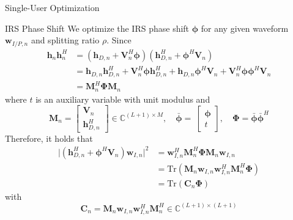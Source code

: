 \documentclass{IEEEtran}
\begin{document}
\begin{section}{Single-User Optimization}
	\begin{subsection}{IRS Phase Shift}
		We optimize the IRS phase shift $\boldsymbol{\phi}$ for any given waveform $\boldsymbol{w}_{I/P,n}$ and splitting ratio $\rho$. Since
		\begin{equation}\label{eq:h_n_outer_product}
			\begin{split}
				\boldsymbol{h}_n\boldsymbol{h}_n^H
				&=(\boldsymbol{h}_{D,n}+\boldsymbol{V}_n^H\boldsymbol{\phi})(\boldsymbol{h}_{D,n}^H+\boldsymbol{\phi}^H\boldsymbol{V}_n)\\
				&=\boldsymbol{h}_{D,n}\boldsymbol{h}_{D,n}^H+\boldsymbol{V}_n^H\boldsymbol{\phi}\boldsymbol{h}_{D,n}^H+\boldsymbol{h}_{D,n}\boldsymbol{\phi}^H\boldsymbol{V}_n+\boldsymbol{V}_n^H\boldsymbol{\phi}\boldsymbol{\phi}^H\boldsymbol{V}_n\\
				&=\boldsymbol{M}_n^H\boldsymbol{\Phi}\boldsymbol{M}_n
			\end{split}
		\end{equation}
		where $t$ is an auxiliary variable with unit modulus and
		\begin{equation}\label{eq:M_n,phi}
			\boldsymbol{M}_n=
			\begin{bmatrix}
				\boldsymbol{V}_n \\
				\boldsymbol{h}_{D,n}^H
			\end{bmatrix} \in \mathbb{C}^{(L+1) \times M},
			\quad \bar{\boldsymbol{\phi}}=\
			\begin{bmatrix}
				\boldsymbol{\phi} \\
				t
			\end{bmatrix},
			\quad \boldsymbol{\Phi}=\bar{\boldsymbol{\phi}}\bar{\boldsymbol{\phi}}^H
		\end{equation}
		Therefore, it holds that
		\begin{equation}
			\begin{split}
				\lvert(\boldsymbol{h}_{D,n}^H+\boldsymbol{\phi}^H\boldsymbol{V}_n)\boldsymbol{w}_{I,n}\rvert^2
				&=\boldsymbol{w}_{I,n}^H\boldsymbol{M}_n^H\boldsymbol{\Phi}\boldsymbol{M}_n\boldsymbol{w}_{I,n}\\
				&=\mathrm{Tr}(\boldsymbol{M}_n\boldsymbol{w}_{I,n}\boldsymbol{w}_{I,n}^H\boldsymbol{M}_n^H\boldsymbol{\Phi})\\
				&=\mathrm{Tr}(\boldsymbol{C}_n\boldsymbol{\Phi})
			\end{split}
		\end{equation}
		with
		\begin{equation}\label{eq:C_n}
			\boldsymbol{C}_n = \boldsymbol{M}_n\boldsymbol{w}_{I,n}\boldsymbol{w}_{I,n}^H\boldsymbol{M}_n^H \in \mathbb{C}^{(L+1)\times(L+1)}

\end{equation}
\end{subsection}
\end{section}
\end{document}
